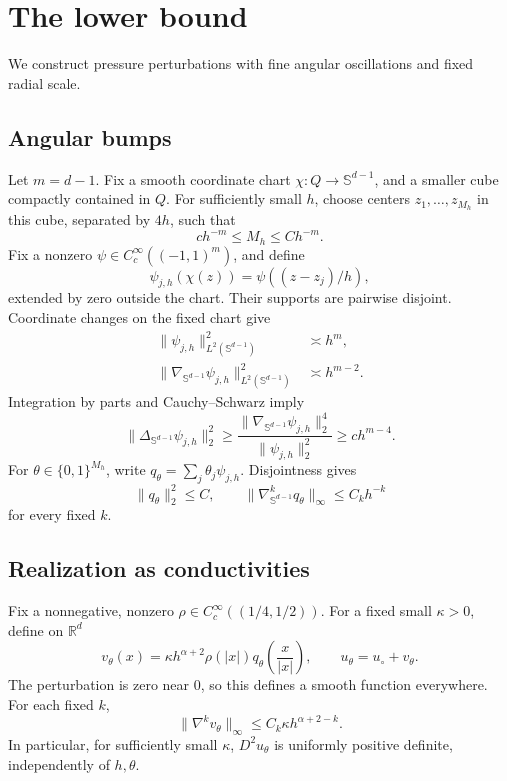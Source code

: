 \documentclass[11pt]{article}
\theoremstyle{remark}
\newcommand{\R}{\mathbb R}
\newcommand{\Sph}{\mathbb S^{d-1}}
\begin{document}
\section{The lower bound}

We construct pressure perturbations with fine angular oscillations
and fixed radial scale.

\subsection{Angular bumps}

Let \(m=d-1\). Fix a smooth coordinate chart
\(\chi:Q\to\Sph\), and a smaller cube compactly contained in \(Q\).
For sufficiently small \(h\), choose centers \(z_1,\ldots,z_{M_h}\)
in this cube, separated by \(4h\), such that
\[
c h^{-m}\leq M_h\leq C h^{-m}.
\]
Fix a nonzero \(\psi\in C^\infty_c((-1,1)^m)\), and define
\[
\psi_{j,h}(\chi(z))=\psi((z-z_j)/h),
\]
extended by zero outside the chart. Their supports are pairwise
disjoint. Coordinate changes on the fixed chart give
\begin{align}
\|\psi_{j,h}\|_{L^2(\Sph)}^2&\asymp h^m,\label{eq:angular-L2}\\
\|\nabla_{\Sph}\psi_{j,h}\|_{L^2(\Sph)}^2&\asymp h^{m-2}.
\label{eq:angular-grad}
\end{align}
Integration by parts and Cauchy--Schwarz imply
\begin{equation}\label{eq:angular-lap}
\|\Delta_{\Sph}\psi_{j,h}\|_2^2
\geq
\frac{\|\nabla_{\Sph}\psi_{j,h}\|_2^4}
{\|\psi_{j,h}\|_2^2}
\geq c h^{m-4}.
\end{equation}
For \(\theta\in\{0,1\}^{M_h}\), write
\(q_\theta=\sum_j\theta_j\psi_{j,h}\).
Disjointness gives
\[
\|q_\theta\|_2^2\leq C,\qquad
\|\nabla_{\Sph}^kq_\theta\|_\infty\leq C_k h^{-k}
\]
for every fixed \(k\).

\subsection{Realization as conductivities}

Fix a nonnegative, nonzero
\(\rho\in C^\infty_c((1/4,1/2))\).
For a fixed small \(\kappa>0\), define on \(\R^d\)
\[
v_\theta(x)=
\kappa h^{\alpha+2}\rho(|x|)
q_\theta\!\left(\frac{x}{|x|}\right),
\qquad
u_\theta=u_\circ+v_\theta.
\]
The perturbation is zero near \(0\), so this defines a smooth
function everywhere. For each fixed \(k\),
\begin{equation}\label{eq:v-derivatives}
\|\nabla^kv_\theta\|_\infty
\leq C_k\kappa h^{\alpha+2-k}.
\end{equation}
In particular, for sufficiently small \(\kappa\),
\(D^2u_\theta\) is uniformly positive definite, independently of
\(h,\theta\).
\end{document}
